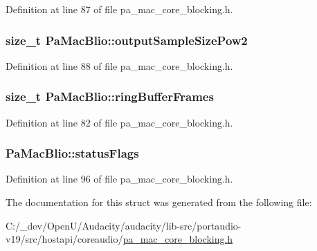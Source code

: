 Definition at line 87 of file pa\+\_\+mac\+\_\+core\+\_\+blocking.\+h.

\subsubsection[{\texorpdfstring{output\+Sample\+Size\+Pow2}{outputSampleSizePow2}}]{\setlength{\rightskip}{0pt plus 5cm}size\+\_\+t Pa\+Mac\+Blio\+::output\+Sample\+Size\+Pow2}\hypertarget{struct_pa_mac_blio_ac4d6907ab5fbc49cc472849b5be0f1c7}{}\label{struct_pa_mac_blio_ac4d6907ab5fbc49cc472849b5be0f1c7}


Definition at line 88 of file pa\+\_\+mac\+\_\+core\+\_\+blocking.\+h.

\subsubsection[{\texorpdfstring{ring\+Buffer\+Frames}{ringBufferFrames}}]{\setlength{\rightskip}{0pt plus 5cm}size\+\_\+t Pa\+Mac\+Blio\+::ring\+Buffer\+Frames}\hypertarget{struct_pa_mac_blio_ae06f808f0742b1389f919084f5beb20b}{}\label{struct_pa_mac_blio_ae06f808f0742b1389f919084f5beb20b}


Definition at line 82 of file pa\+\_\+mac\+\_\+core\+\_\+blocking.\+h.

\subsubsection[{\texorpdfstring{status\+Flags}{statusFlags}}]{ Pa\+Mac\+Blio\+::status\+Flags}\hypertarget{struct_pa_mac_blio_a0535aaa4f74b2ae10ac0c7fd561bd4ee}{}\label{struct_pa_mac_blio_a0535aaa4f74b2ae10ac0c7fd561bd4ee}


Definition at line 96 of file pa\+\_\+mac\+\_\+core\+\_\+blocking.\+h.



The documentation for this struct was generated from the following file\+:\begin{DoxyCompactItemize}
\item 
C\+:/\+\_\+dev/\+Open\+U/\+Audacity/audacity/lib-\/src/portaudio-\/v19/src/hostapi/coreaudio/\hyperlink{pa__mac__core__blocking_8h}{pa\+\_\+mac\+\_\+core\+\_\+blocking.\+h}\end{DoxyCompactItemize}

